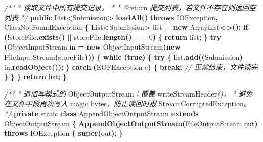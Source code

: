 \documentclass[
  11pt,
]{ctexart}
\newenvironment{Shaded}{\begin{snugshade}}{\end{snugshade}}
\newcommand{\BuiltInTok}[1]{#1}
\newcommand{\CommentTok}[1]{\textcolor[rgb]{0.56,0.35,0.01}{\textit{#1}}}
\newcommand{\ControlFlowTok}[1]{\textcolor[rgb]{0.13,0.29,0.53}{\textbf{#1}}}
\newcommand{\DataTypeTok}[1]{\textcolor[rgb]{0.13,0.29,0.53}{#1}}
\newcommand{\DecValTok}[1]{\textcolor[rgb]{0.00,0.00,0.81}{#1}}
\newcommand{\FunctionTok}[1]{\textcolor[rgb]{0.13,0.29,0.53}{\textbf{#1}}}
\newcommand{\KeywordTok}[1]{\textcolor[rgb]{0.13,0.29,0.53}{\textbf{#1}}}
\newcommand{\NormalTok}[1]{#1}
\newcommand{\OperatorTok}[1]{\textcolor[rgb]{0.81,0.36,0.00}{\textbf{#1}}}
\begin{document}
\begin{Shaded}
\begin{Highlighting}[]
    \CommentTok{/**}
     \CommentTok{*} \CommentTok{读取文件中所有提交记录。}
     \CommentTok{*}
\CommentTok{     * @}\NormalTok{return }\CommentTok{提交列表，若文件不存在则返回空列表}
     \CommentTok{*/}
    \KeywordTok{public} \BuiltInTok{List}\OperatorTok{\textless{}}\NormalTok{Submission}\OperatorTok{\textgreater{}} \FunctionTok{loadAll}\OperatorTok{()} \KeywordTok{throws} \BuiltInTok{IOException}\OperatorTok{,} \BuiltInTok{ClassNotFoundException} \OperatorTok{\{}
        \BuiltInTok{List}\OperatorTok{\textless{}}\NormalTok{Submission}\OperatorTok{\textgreater{}}\NormalTok{ list }\OperatorTok{=} \KeywordTok{new} \BuiltInTok{ArrayList}\OperatorTok{\textless{}\textgreater{}();}
        \ControlFlowTok{if} \OperatorTok{(!}\NormalTok{storeFile}\OperatorTok{.}\FunctionTok{exists}\OperatorTok{()} \OperatorTok{||}\NormalTok{ storeFile}\OperatorTok{.}\FunctionTok{length}\OperatorTok{()} \OperatorTok{==} \DecValTok{0}\OperatorTok{)} \OperatorTok{\{}
            \ControlFlowTok{return}\NormalTok{ list}\OperatorTok{;}
        \OperatorTok{\}}
        \ControlFlowTok{try} \OperatorTok{(}\BuiltInTok{ObjectInputStream}\NormalTok{ in }\OperatorTok{=}
                 \KeywordTok{new} \BuiltInTok{ObjectInputStream}\OperatorTok{(}\KeywordTok{new} \BuiltInTok{FileInputStream}\OperatorTok{(}\NormalTok{storeFile}\OperatorTok{)))} \OperatorTok{\{}
            \ControlFlowTok{while} \OperatorTok{(}\KeywordTok{true}\OperatorTok{)} \OperatorTok{\{}
                \ControlFlowTok{try} \OperatorTok{\{}
\NormalTok{                    list}\OperatorTok{.}\FunctionTok{add}\OperatorTok{((}\NormalTok{Submission}\OperatorTok{)}\NormalTok{ in}\OperatorTok{.}\FunctionTok{readObject}\OperatorTok{());}
                \OperatorTok{\}} \ControlFlowTok{catch} \OperatorTok{(}\BuiltInTok{EOFException}\NormalTok{ e}\OperatorTok{)} \OperatorTok{\{}
                    \ControlFlowTok{break}\OperatorTok{;}  \CommentTok{// 正常结束，文件读完}
                \OperatorTok{\}}
            \OperatorTok{\}}
        \OperatorTok{\}}
        \ControlFlowTok{return}\NormalTok{ list}\OperatorTok{;}
    \OperatorTok{\}}

    \CommentTok{/**}
     \CommentTok{*} \CommentTok{追加写模式的}\NormalTok{ ObjectOutputStream}\CommentTok{：覆盖}\NormalTok{ writeStreamHeader}\CommentTok{()，}
     \CommentTok{*} \CommentTok{避免在文件中段再次写入}\NormalTok{ magic bytes}\CommentTok{，防止读回时报}\NormalTok{ StreamCorruptedException}\CommentTok{。}
     \CommentTok{*/}
    \KeywordTok{private} \DataTypeTok{static} \KeywordTok{class}\NormalTok{ AppendObjectOutputStream }\KeywordTok{extends} \BuiltInTok{ObjectOutputStream} \OperatorTok{\{}
        \FunctionTok{AppendObjectOutputStream}\OperatorTok{(}\BuiltInTok{FileOutputStream}\NormalTok{ out}\OperatorTok{)} \KeywordTok{throws} \BuiltInTok{IOException} \OperatorTok{\{}
            \KeywordTok{super}\OperatorTok{(}\NormalTok{out}\OperatorTok{);}
        \OperatorTok{\}}


\end{Highlighting}
\end{Shaded}
\end{document}
